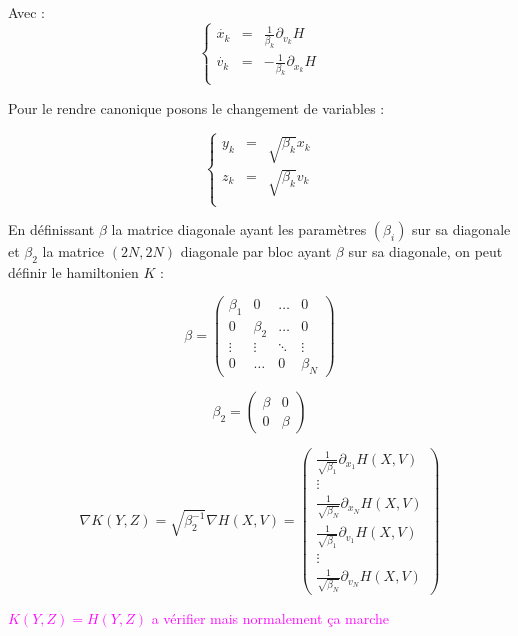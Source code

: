 \documentclass[a4paper,11pt]{article}
\newcommand{\carybe}[1]{ \textcolor{magenta}{#1}}
\begin{document}
Avec :
$$
\left\lbrace
\begin{array}{rcl}
	\dot{x_k} &=& \frac{1}{\beta_k} \partial_{v_k} H \\
	\dot{v_k} &=& - \frac{1}{\beta_k} \partial_{x_k} H \\

\end{array}
\right.
$$

Pour le rendre canonique posons le changement de variables : 

$$
\left\lbrace
\begin{array}{rcl}
	y_k &=& \sqrt{\beta_k} x_k \\
	z_k &=& \sqrt{\beta_k} v_k \\
\end{array}
\right.
$$

En définissant $\beta$ la matrice diagonale ayant les paramètres $(\beta_i)$ sur sa diagonale  et $\beta_2$ la matrice $(2N,2N)$ diagonale par bloc ayant $\beta$ sur sa diagonale, on peut définir le hamiltonien $K$ :

$$
\beta = \left( \begin{array}{cccc}
					\beta_1 & 0  &\dots & 0 \\
					0 & \beta_2  &\dots & 0 \\
					\vdots  & \vdots  & \ddots &\vdots  \\
					0 & \dots & 0 & \beta_N
\end{array} \right)
$$

$$
\beta_2 = \left( \begin{array}{cccc}
					\beta & 0  \\
					0 & \beta  
\end{array} \right)
$$

$$
\nabla K(Y,Z) = \sqrt{\beta_2^{-1}} \nabla H(X,V) = \left( \begin{array}{c}
	
	\frac{1}{\sqrt{\beta_1}}\partial_{x_1} H(X,V) \\
	\vdots \\
	\frac{1}{\sqrt{\beta_N}}\partial_{x_N} H(X,V) \\
	\frac{1}{\sqrt{\beta_1}}\partial_{v_1} H(X,V) \\
	\vdots \\
	\frac{1}{\sqrt{\beta_N}}\partial_{v_N} H(X,V) 

\end{array} \right)
$$

\carybe{$K(Y,Z) = H(Y,Z)$ a vérifier mais normalement ça marche}
\end{document}
